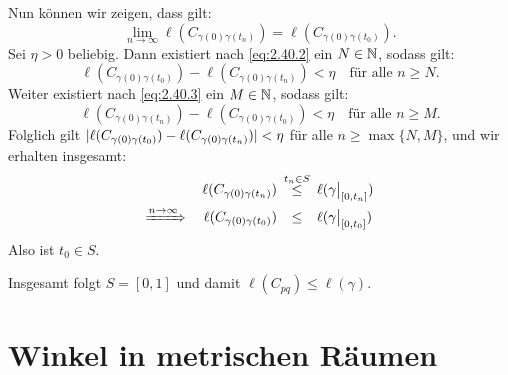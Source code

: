 \begin{beweis}
\begin{itemize}
		Nun können wir zeigen, dass gilt:
		\[
			\lim\limits_{n \rightarrow \infty} \ell(C_{\gamma(0)\gamma(t_n)}) = \ell(C_{\gamma(0)\gamma(t_0)}).
		\]
		Sei $\eta > 0$ beliebig.
		Dann existiert nach \eqref{eq:2.40.2} ein $N \in \mathbb{N}$, sodass gilt:
		\[
			\ell(C_{\gamma(0)\gamma(t_0)}) - \ell(C_{\gamma(0)\gamma(t_n)}) < \eta \quad \text{für alle } n \geq N.
		\]
		Weiter existiert nach \eqref{eq:2.40.3} ein $M \in \mathbb{N}$, sodass gilt:
		\[
			\ell(C_{\gamma(0)\gamma(t_n)}) - \ell(C_{\gamma(0)\gamma(t_0)}) < \eta \quad \text{für alle } n \geq M.
		\]		
		Folglich gilt $\lvert\ell(C_{\gamma(0)\gamma(t_0)}) - \ell(C_{\gamma(0)\gamma(t_n)})\rvert < \eta$ für alle $n \geq \max\{N,M\}$, und wir erhalten insgesamt:
		\begin{align*}
			\ell(C_{\gamma(0)\gamma(t_n)}) &\stack{t_n \in S}{\leq} \ell(\gamma \big|_{[0,t_n]}) \\
			\xRightarrow{n \rightarrow \infty} \quad \ell(C_{\gamma(0)\gamma(t_0)}) &\stack{}{\leq} \ell(\gamma \big|_{[0,t_0]})
		\end{align*}
		Also ist $t_0 \in S$.
	\end{itemize}
	Insgesamt folgt $S = [0,1]$ und damit $\ell(C_{pq}) \leq \ell(\gamma)$. \qedhere
\end{beweis}

\section{Winkel in metrischen Räumen}
\label{sec:2.4}

